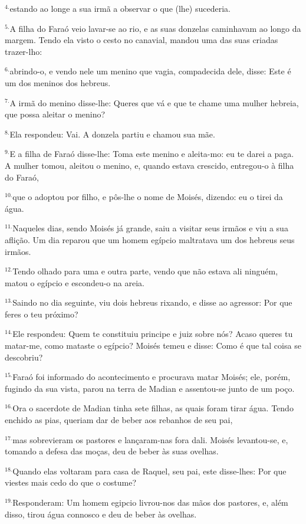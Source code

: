 \documentclass[a4paper,14pt]{extarticle} \usepackage[utf8]{inputenc}
\begin{document}
$^{4. }$estando ao longe a sua irmã a observar o que (lhe) sucederia.

$^{5. }$A filha do Faraó veio lavar-se ao rio, e as suas donzelas caminhavam ao longo da margem. Tendo ela visto o cesto no canavial, mandou uma das suas criadas trazer-lho:

$^{6. }$abrindo-o, e vendo nele um menino que vagia, compadecida dele, disse: Este é um dos meninos dos hebreus.

$^{7. }$A irmã do menino disse-lhe: Queres que vá e que te chame uma mulher hebreia, que possa aleitar o menino?

$^{8. }$Ela respondeu: Vai. A donzela partiu e chamou sua mãe.

$^{9. }$E a filha de Faraó disse-lhe: Toma este menino e aleita-mo: eu te darei a paga. A mulher tomou, aleitou o menino, e, quando estava crescido, entregou-o à filha do Faraó,

$^{10. }$que o adoptou por filho, e pôs-lhe o nome de Moisés, dizendo: eu o tirei da água.

$^{11. }$Naqueles dias, sendo Moisés já grande, saiu a visitar seus irmãos e viu a sua aflição. Um dia reparou que um homem egípcio maltratava um dos hebreus seus irmãos.

$^{12. }$Tendo olhado para uma e outra parte, vendo que não estava ali ninguém, matou o egípcio e escondeu-o na areia.

$^{13. }$Saindo no dia seguinte, viu dois hebreus rixando, e disse ao agressor: Por que feres o teu próximo?

$^{14. }$Ele respondeu: Quem te constituiu principe e juiz sobre nós? Acaso queres tu matar-me, como mataste o egípcio? Moisés temeu e disse: Como é que tal coisa se descobriu?

$^{15. }$Faraó foi informado do acontecimento e procurava matar Moisés; ele, porém, fugindo da sua vista, parou na terra de Madian e assentou-se junto de um poço.

$^{16. }$Ora o sacerdote de Madian tinha sete filhas, as quais foram tirar água. Tendo enchido as pias, queriam dar de beber aos rebanhos de seu pai,

$^{17. }$mas sobrevieram os pastores e lançaram-nas fora dali. Moisés levantou-se, e, tomando a defesa das moças, deu de beber às suas ovelhas.

$^{18. }$Quando elas voltaram para casa de Raquel, seu pai, este disse-lhes: Por que viestes mais cedo do que o costume?

$^{19. }$Responderam: Um homem egipcio livrou-nos das mãos dos pastores, e, além disso, tirou água connosco e deu de beber às ovelhas.
\end{document}
